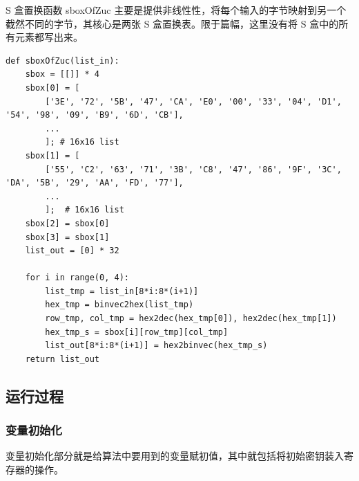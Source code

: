 S 盒置换函数 { \cnsls sboxOfZuc} 主要是提供非线性性，将每个输入的字节映射到另一个截然不同的字节，其核心是两张 S 盒置换表。限于篇幅，这里没有将 S 盒中的所有元素都写出来。

\begin{lstlisting}[style=myPython,label={lst:sboxofzuc},caption={S 盒置换函数}]
def sboxOfZuc(list_in):
    sbox = [[]] * 4
    sbox[0] = [
        ['3E', '72', '5B', '47', 'CA', 'E0', '00', '33', '04', 'D1', '54', '98', '09', 'B9', '6D', 'CB'], 
        ...
        ]; # 16x16 list
    sbox[1] = [
        ['55', 'C2', '63', '71', '3B', 'C8', '47', '86', '9F', '3C', 'DA', '5B', '29', 'AA', 'FD', '77'], 
        ...
        ];  # 16x16 list
    sbox[2] = sbox[0]
    sbox[3] = sbox[1]
    list_out = [0] * 32

    for i in range(0, 4):
        list_tmp = list_in[8*i:8*(i+1)]
        hex_tmp = binvec2hex(list_tmp)
        row_tmp, col_tmp = hex2dec(hex_tmp[0]), hex2dec(hex_tmp[1])
        hex_tmp_s = sbox[i][row_tmp][col_tmp]
        list_out[8*i:8*(i+1)] = hex2binvec(hex_tmp_s)
    return list_out
\end{lstlisting}


\subsection{运行过程}

\subsubsection{变量初始化}

变量初始化部分就是给算法中要用到的变量赋初值，其中就包括将初始密钥装入寄存器的操作。

